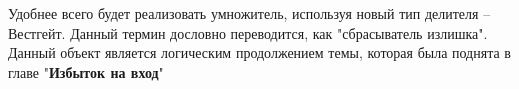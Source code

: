 Удобнее всего будет реализовать умножитель, используя новый тип делителя -- Вестгейт. Данный термин дословно переводится, как "сбрасыватель излишка". Данный объект является логическим продолжением темы, которая была поднята в главе "\textbf{Избыток на вход}"
















































































































